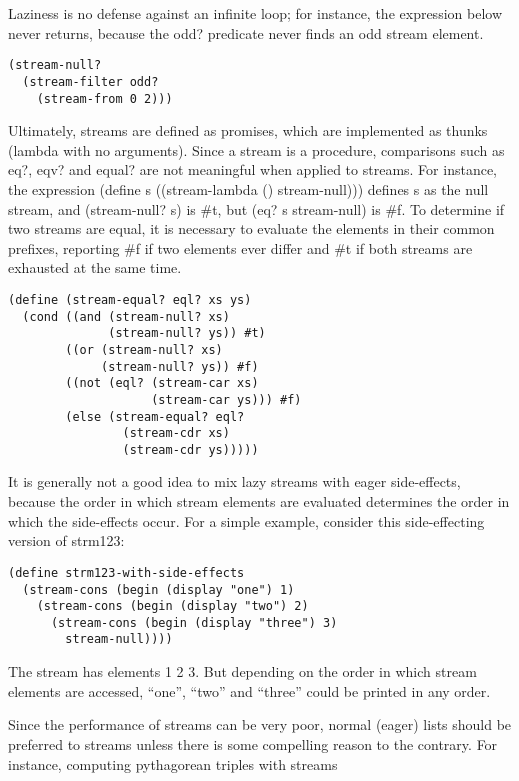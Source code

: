 Laziness is no defense against an infinite loop; for instance, the
expression below never returns, because the odd? predicate never finds
an odd stream element.

\begin{verbatim}
(stream-null?
  (stream-filter odd?
    (stream-from 0 2)))
\end{verbatim}

Ultimately, streams are defined as promises, which are implemented as
thunks (lambda with no arguments). Since a stream is a procedure,
comparisons such as eq?, eqv? and equal? are not meaningful when applied
to streams. For instance, the expression (define s ((stream-lambda ()
stream-null))) defines s as the null stream, and (stream-null? s) is
\#t, but (eq? s stream-null) is \#f. To determine if two streams are
equal, it is necessary to evaluate the elements in their common
prefixes, reporting \#f if two elements ever differ and \#t if both
streams are exhausted at the same time.

\begin{verbatim}
(define (stream-equal? eql? xs ys)
  (cond ((and (stream-null? xs)
              (stream-null? ys)) #t)
        ((or (stream-null? xs)
             (stream-null? ys)) #f)
        ((not (eql? (stream-car xs)
                    (stream-car ys))) #f)
        (else (stream-equal? eql?
                (stream-cdr xs)
                (stream-cdr ys)))))
\end{verbatim}

It is generally not a good idea to mix lazy streams with eager
side-effects, because the order in which stream elements are evaluated
determines the order in which the side-effects occur. For a simple
example, consider this side-effecting version of strm123:

\begin{verbatim}
(define strm123-with-side-effects
  (stream-cons (begin (display "one") 1)
    (stream-cons (begin (display "two") 2)
      (stream-cons (begin (display "three") 3)
        stream-null))))
\end{verbatim}

The stream has elements 1 2 3. But depending on the order in which
stream elements are accessed, ``one'', ``two'' and ``three'' could be
printed in any order.

Since the performance of streams can be very poor, normal (eager) lists
should be preferred to streams unless there is some compelling reason to
the contrary. For instance, computing pythagorean triples with streams

